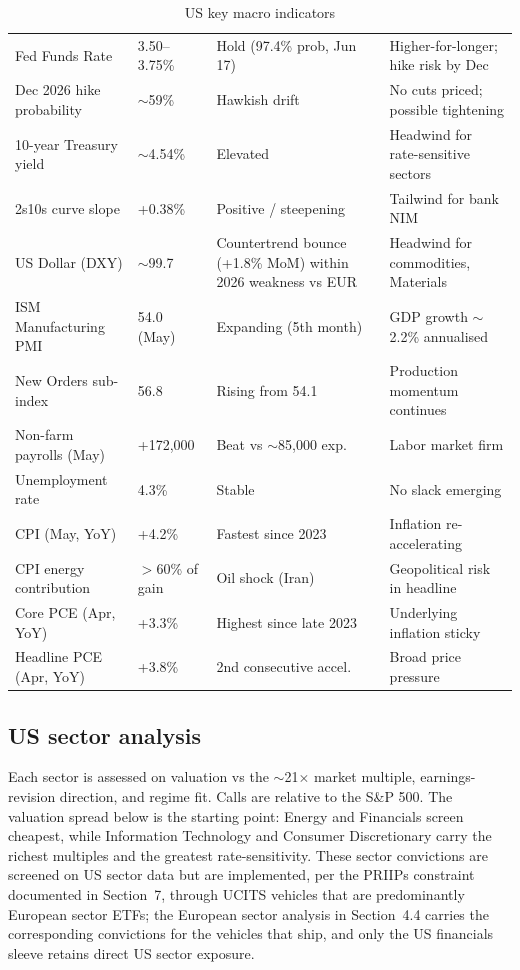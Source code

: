 \documentclass[11pt,a4paper]{article}
\begin{document}
\begin{table}[htbp]
\caption{US key macro indicators}
\small
\begin{tabularx}{\linewidth}{P{3.4cm} P{2.9cm} P{3.4cm} L}
\toprule
{} &  &  &  \\
\midrule
Fed Funds Rate & 3.50--3.75\% & Hold (97.4\% prob, Jun 17) & Higher-for-longer; hike risk by Dec \\
Dec 2026 hike probability & \(\sim\)59\% & Hawkish drift & No cuts priced; possible tightening \\
10-year Treasury yield & \(\sim\)4.54\% & Elevated & Headwind for rate-sensitive sectors \\
2s10s curve slope & +0.38\% & Positive / steepening & Tailwind for bank NIM \\
US Dollar (DXY) & \(\sim\)99.7 & Countertrend bounce (+1.8\% MoM) within 2026 weakness vs EUR & Headwind for commodities, Materials \\
ISM Manufacturing PMI & 54.0 (May) & Expanding (5th month) & GDP growth \(\sim\)2.2\% annualised \\
New Orders sub-index & 56.8 & Rising from 54.1 & Production momentum continues \\
Non-farm payrolls (May) & +172,000 & Beat vs \(\sim\)85,000 exp. & Labor market firm \\
Unemployment rate & 4.3\% & Stable & No slack emerging \\
CPI (May, YoY) & +4.2\% & Fastest since 2023 & Inflation re-accelerating \\
CPI energy contribution & \(>\)60\% of gain & Oil shock (Iran) & Geopolitical risk in headline \\
Core PCE (Apr, YoY) & +3.3\% & Highest since late 2023 & Underlying inflation sticky \\
Headline PCE (Apr, YoY) & +3.8\% & 2nd consecutive accel. & Broad price pressure \\
\bottomrule
\end{tabularx}
\end{table}

\subsection{US sector analysis}

Each sector is assessed on valuation vs the \(\sim\)21\(\times\) market multiple, earnings-revision direction, and regime fit. Calls are relative to the S\&P 500. The valuation spread below is the starting point: Energy and Financials screen cheapest, while Information Technology and Consumer Discretionary carry the richest multiples and the greatest rate-sensitivity. These sector convictions are screened on US sector data but are implemented, per the PRIIPs constraint documented in Section~7, through UCITS vehicles that are predominantly European sector ETFs; the European sector analysis in Section~4.4 carries the corresponding convictions for the vehicles that ship, and only the US financials sleeve retains direct US sector exposure.
\end{document}
